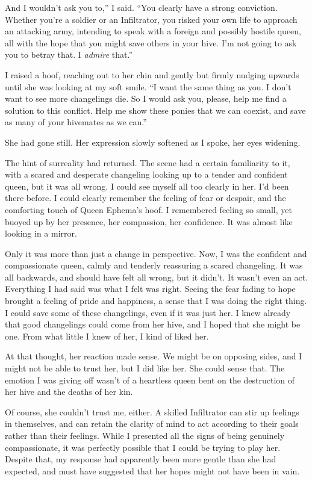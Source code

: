 \leavevmode{}And I wouldn’t ask you to,” I said. “You clearly have a strong conviction. Whether you’re a soldier or an Infiltrator, you risked your own life to approach an attacking army, intending to speak with a foreign and possibly hostile queen, all with the hope that you might save others in your hive. I’m not going to ask you to betray that. I \textit{admire} that.”

I raised a hoof, reaching out to her chin and gently but firmly nudging upwards until she was looking at my soft smile. “I want the same thing as you. I don’t want to see more changelings die. So I would ask you, please, help me find a solution to this conflict. Help me show these ponies that we can coexist, and save as many of your hivemates as we can.”

She had gone still. Her expression slowly softened as I spoke, her eyes widening.

The hint of surreality had returned. The scene had a certain familiarity to it, with a scared and desperate changeling looking up to a tender and confident queen, but it was all wrong. I could see myself all too clearly in her. I’d been there before. I could clearly remember the feeling of fear or despair, and the comforting touch of Queen Ephema’s hoof. I remembered feeling so small, yet buoyed up by her presence, her compassion, her confidence. It was almost like looking in a mirror.

Only it was more than just a change in perspective. Now, I was the confident and compassionate queen, calmly and tenderly reassuring a scared changeling. It was all backwards, and should have felt all wrong, but it didn’t. It wasn’t even an act. Everything I had said was what I felt was right. Seeing the fear fading to hope brought a feeling of pride and happiness, a sense that I was doing the right thing. I could save some of these changelings, even if it was just her. I knew already that good changelings could come from her hive, and I hoped that she might be one. From what little I knew of her, I kind of liked her.

At that thought, her reaction made sense. We might be on opposing sides, and I might not be able to trust her, but I did like her. She could sense that. The emotion I was giving off wasn’t of a heartless queen bent on the destruction of her hive and the deaths of her kin.

Of course, she couldn’t trust me, either. A skilled Infiltrator can stir up feelings in themselves, and can retain the clarity of mind to act according to their goals rather than their feelings. While I presented all the signs of being genuinely compassionate, it was perfectly possible that I could be trying to play her. Despite that, my response had apparently been more gentle than she had expected, and must have suggested that her hopes might not have been in vain.

